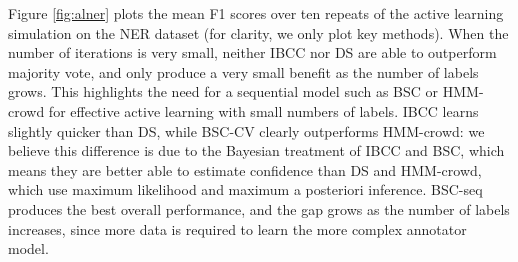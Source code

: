  Figure \ref{fig:alner} plots the mean F1 scores over ten repeats of the active learning simulation on the NER dataset (for clarity, we only plot key methods).
 When the number of iterations is very small, neither IBCC nor DS are able to outperform majority vote, and only produce a very small
 benefit as the number of labels grows. This highlights the need for a sequential model such as BSC or HMM-crowd for
 effective active learning with small numbers of labels.
 IBCC learns slightly quicker than DS,
 while BSC-CV clearly outperforms HMM-crowd: we believe this difference is due to the Bayesian treatment of IBCC and BSC,
 which means they are better able to estimate confidence than DS and HMM-crowd, which use maximum likelihood and maximum a posteriori inference.
 BSC-seq produces the best overall performance, and the gap grows as the number of labels increases, 
 since more data is required to learn the more complex annotator model.  
